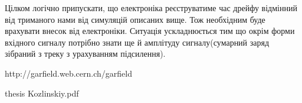 \documentclass[]{article}
\begin{document}
	Цілком логічно припускати, що електроніка реєструватиме час дрейфу відмінний від триманого нами від симуляцій описаних вище. Тож необхідним буде врахувати внесок від електроніки. Ситуація ускладнюється тим що окрім форми вхідного сигналу потрібно знати ще й амплітуду сигналу(сумарний заряд зібраний з треку з урахуванням підсилення).
	
\newpage
\begin{thebibliography}{00}
	 http://garfield.web.cern.ch/garfield

	  thesis Kozlinskiy.pdf 
	
\end{thebibliography}
	
\end{document}
